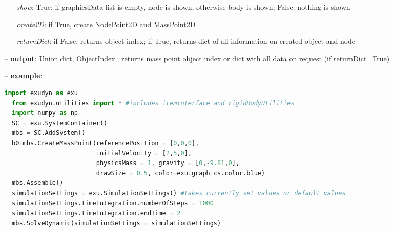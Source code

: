\begin{itemize}[leftmargin=0.7cm]
\begin{itemize}[leftmargin=1.2cm]
\item[]{\it show}: True: if graphicsData list is empty, node is shown, otherwise body is shown; False: nothing is shown
\item[]{\it create2D}: if True, create NodePoint2D and MassPoint2D
\item[]{\it returnDict}: if False, returns object index; if True, returns dict of all information on created object and node
\end{itemize}
\item[--]
{\bf output}: Union[dict, ObjectIndex]; returns mass point object index or dict with all data on request (if returnDict=True)
\item[--]
{\bf example}: \vspace{-12pt}\ei\begin{lstlisting}[language=Python, xleftmargin=36pt]
  import exudyn as exu
  from exudyn.utilities import * #includes itemInterface and rigidBodyUtilities
  import numpy as np
  SC = exu.SystemContainer()
  mbs = SC.AddSystem()
  b0=mbs.CreateMassPoint(referencePosition = [0,0,0],
                         initialVelocity = [2,5,0],
                         physicsMass = 1, gravity = [0,-9.81,0],
                         drawSize = 0.5, color=exu.graphics.color.blue)
  mbs.Assemble()
  simulationSettings = exu.SimulationSettings() #takes currently set values or default values
  simulationSettings.timeIntegration.numberOfSteps = 1000
  simulationSettings.timeIntegration.endTime = 2
  mbs.SolveDynamic(simulationSettings = simulationSettings)
\end{lstlisting}\vspace{-24pt}\bi\item[]\vspace{-24pt}\vspace{12pt}\end{itemize}
%

